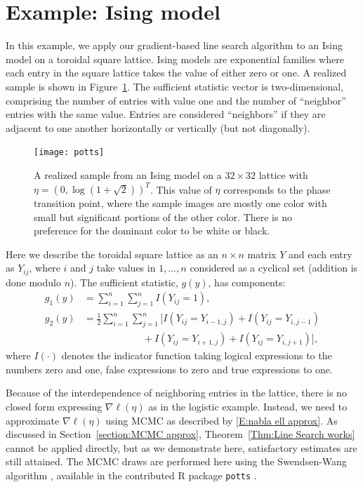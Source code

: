 \section{Example: Ising model} \label{S:Examples:Ising}
In this example, we apply our gradient-based line search algorithm to an Ising model 
\citep{Ising} on a toroidal square 
lattice.  Ising models are exponential families where each entry in the square lattice 
takes the value of either zero 
or one.  A realized sample is shown in Figure~\ref{F:pottsimage}.  The sufficient 
statistic vector is two-dimensional, 
comprising the number of entries with value one and the number of ``neighbor'' entries 
with the same value.  Entries are 
considered ``neighbors'' if they are adjacent to one another horizontally or 
vertically (but not diagonally).  
\begin{figure}[h]
\begin{center}
\texttt{[image: potts]}
\end{center}
\caption{A realized sample from an Ising model on a $32 \times 32$ lattice with $\eta 
= \left(0, \log(1 + \sqrt{2}) 
\right)^T$.  This value of $\eta$ corresponds to the phase transition point, where 
the sample images are mostly one 
color with small but significant portions of the other color.  There is no preference 
for the dominant color to be 
white or black.}
\label{F:pottsimage}
\end{figure}

Here we describe the toroidal square lattice as an $n \times n$ matrix $Y$ and each 
entry as $Y_{ij}$, where $i$ and $j
$ take values in $1, \ldots, n$ considered as a cyclical set (addition is done modulo 
$n$).  The sufficient statistic, 
$g(y)$, has components:
\begin{align*}
	g_1(y) &= \sum_{i=1}^n \sum_{j=1}^n I(Y_{ij}=1), \\
	g_2(y) &= \frac{1}{2} \sum_{i=1}^n \sum_{j=1}^n 
				\bigl[ I(Y_{ij}=Y_{i-1,j}) + I(Y_{ij}=Y_{i,j-1}) \\
							&\qquad \qquad \qquad + I(Y_{ij}=Y_{i+1,j}) + I(Y_{ij}=Y_
{i,j+1}) \bigr ]
				,
\end{align*}  
where $I(\cdot)$ denotes the indicator function taking logical expressions to the 
numbers zero and one, false 
expressions to zero and true expressions to one.  

Because of the interdependence of neighboring entries in the lattice, there is no 
closed form expressing $\nabla \ell
( \eta)$ as in the logistic example.  Instead, we need to approximate $\nabla \ell
( \eta)$ using MCMC as described by 
\eqref{E:nabla ell approx}.  As discussed in Section~\ref{section:MCMC approx}, 
Theorem~\ref{Thm:Line Search works} 
cannot be applied directly, but as we demonstrate here, satisfactory estimates are 
still attained.  The MCMC draws are 
performed here using the Swendsen-Wang algorithm \citep{Swendsen-Wang:1987,Swendsen-
Wang:1990}, available in the contributed R 
package \texttt{potts} \citep{Geyer:potts}.

